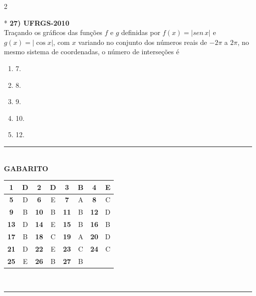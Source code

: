 \documentclass[11pt,a4paper]{article}
\begin{document}
\begin{paracol}{2}
    \switchcolumn[1]
    \vspace{15cm}

    \switchcolumn[0]*
    \textbf{27) UFRGS-2010} \\
    Traçando os gráficos das funções $f$ e $g$ definidas por $f(x) = |sen\, x|$ e $g(x) = |\cos x|$, com $x$ variando no conjunto dos números reais de $-2\pi$ a $2\pi$, no mesmo sistema de coordenadas, o número de interseções é

    \begin{enumerate}[label=(\Alph*), itemsep=0.2cm]
        \item 7.
        \item 8.
        \item 9.
        \item 10.
        \item 12.
    \end{enumerate}
    \vspace{0.4cm}

    \switchcolumn[1]
    \vspace{5cm}

\end{paracol}

\vspace{1cm}

\begin{center}
    \rule{0.6\textwidth}{0.5pt} \\[0.3cm]
    \textbf{\large GABARITO} \\[0.3cm]
    \begin{tabular}{|c|c|c|c|c|c|c|c|}
        \hline
        \textbf{1}  & D & \textbf{2}  & D & \textbf{3}  & B & \textbf{4}            & E \\ \hline
        \textbf{5}  & D & \textbf{6}  & E & \textbf{7}  & A & \textbf{8}            & C \\ \hline
        \textbf{9}  & B & \textbf{10} & B & \textbf{11} & B & \textbf{12}           & D \\ \hline
        \textbf{13} & D & \textbf{14} & E & \textbf{15} & B & \textbf{16}           & B \\ \hline
        \textbf{17} & B & \textbf{18} & C & \textbf{19} & A & \textbf{20}           & D \\ \hline
        \textbf{21} & D & \textbf{22} & E & \textbf{23} & C & \textbf{24}           & C \\ \hline
        \textbf{25} & E & \textbf{26} & B & \textbf{27} & B & \multicolumn{2}{c|}{}     \\ \hline
    \end{tabular} \\[0.3cm]
    \rule{0.6\textwidth}{0.5pt}
\end{center}
\end{document}
